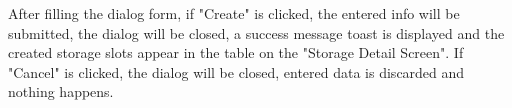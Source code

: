 After filling the dialog form, if "Create" is clicked, the entered info will be submitted, the dialog will be closed, a success message toast is displayed and the created storage slots appear in the table on the "Storage Detail Screen". If "Cancel" is clicked, the dialog will be closed, entered data is discarded and nothing happens.

\begin{figure}[H] %
	\centering

    \vspace{10pt}
    \hspace{5pt}


\end{figure}
